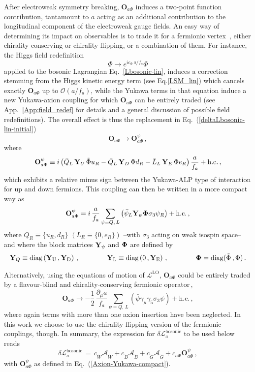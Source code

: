 \documentclass[11pt]{article}
\newcommand{\A}{\mathcal{A}}
\renewcommand{\O}{\mathbf{O}}
\renewcommand{\to}{\rightarrow}
\newcommand{\de}{\partial}
\newcommand{\hc}{\mathrm{h.c.}}
\newcommand{\beq}{\begin{equation}}
\newcommand{\eeq}{\end{equation}}
\renewcommand{\[}{\begin{equation}}
\renewcommand{\]}{\end{equation}}
\newcommand{\LL}{\mathscr{L}}
\def\cY{{\bf Y}}
\def\cY{{\bf Y}}
\begin{document}
After electroweak symmetry breaking, $\O_{a\Phi}$ induces a  two-point function contribution, tantamount to $a$ acting as an additional contribution to the longitudinal component of the electroweak gauge fields. An easy way of determining its  impact on observables is to trade it for a fermionic vertex~\cite{Georgi:1986df}, either chirality conserving or chirality flipping, or a combination of them.  
 For instance, the Higgs field redefinition
\beq
\Phi\to e^{ic_\Phi\, a/f_a}\Phi
\label{Oaphiequiv}
\eeq
 applied to  the bosonic Lagrangian Eq.~\eqref{Lbosonic-lin}, induces a correction stemming from the Higgs kinetic energy term (see Eq.\eqref{LSM_lin})
which cancels exactly $\O_{a\Phi}$ up to $\mathcal{O}(a/f_a)$, while the Yukawa terms in that equation induce a new Yukawa-axion coupling for which $\O_{a\Phi}$ can be entirely traded (see App.~\ref{App:field_redef} for details and  a general discussion of possible field redefinitions). 
 The overall effect  
 is thus the  
 replacement in Eq.~(\ref{deltaLbosonic-lin-initial})   
 \begin{equation}
 \O_{a\Phi} \longrightarrow \O^\psi_{a\Phi}\,,
  \end{equation}
where
\beq
\label{axion-Yukawa}
\O^\psi_{a\Phi}\equiv i\left(\bar{Q}_L\,\cY_U\,\tilde\Phi u_R-\bar{Q}_L\,\cY_D\,\Phi d_R-\bar{L}_L\,\cY_E\,\Phi e_R\right)\frac{a}{f_a} + \hc\,,
\eeq
%
which exhibits a relative minus sign between the Yukawa-ALP type of interaction for up and down fermions. This coupling can then be written in a more compact way as \beq
\label{Axion-Yukawa-compact}
\O^\psi_{a\Phi}= i\,\frac{a}{f_a}\sum_{\psi=Q,\,L} \left(\bar\psi_{L}{\bf \mathcal{\bf Y}_\psi}{\bf \Phi}\sigma_3 \psi_{R}\right)+ \hc\,,
\eeq
%
where $Q_R\equiv \{u_R,d_R \} \, \, \left( L_R\equiv \{0,e_R \} \right) $ --with $\sigma_3$ acting on weak isospin space-- and where the block matrices $\mathcal{{\bf Y}}_\psi$ and ${\bf \Phi}$ are defined by
%
\begin{equation}
\mathcal{{\bf Y}}_Q \equiv \rm{diag}\left( \cY_U\,, \cY_{D}\right) \,,\qquad \qquad 
\mathcal{{\bf Y}}_L \equiv \rm{diag}\left( 0\,, \cY_{E}\right) \,,\qquad \qquad  \bf{\Phi}=\rm{diag}(\tilde\Phi\,,\Phi)\,.
\label{Yukawa_matrices}
\end{equation}

Alternatively, using the equations of motion of 
 $\LL^{\text{LO}}$, $\O_{a\Phi}$ could be entirely traded by a flavour-blind and chirality-conserving fermionic operator\,,
\beq
\O_{a\Phi}\longrightarrow-\frac{1}{2}\,\frac{\de_\mu a}{f_a} \sum_{ \psi=Q,\,L} \left(\bar\psi\gamma_\mu \gamma_5 \sigma_3 \psi\right)+ \hc\,,
\label{Axion-fermion-from-bosonic}
\eeq
%
where again terms with more than one axion insertion have been neglected. In this work we choose to use  the chirality-flipping version of the fermionic couplings,
 though. In summary,  the expression for $\delta\LL_a^\text{bosonic}$ to be used below reads
 \beq
\delta\LL_a^\text{bosonic}\,=\,c_{\tilde{W}}\A_{\tilde{W}}+c_{\tilde{B}}\A_{\tilde{B}}+c_{\tilde{G}}\A_{\tilde{G}}+c_{a\Phi}\O^\psi_{a\Phi}\,,
\label{deltaLbosonic-lin}
\eeq
with $\O^\psi_{a\Phi}$ as defined in Eq.~(\ref{Axion-Yukawa-compact}).
\end{document}
